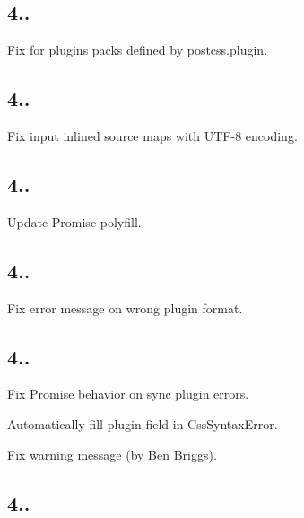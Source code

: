 \subsection*{4..}


\begin{DoxyItemize}
\item Fix for plugins packs defined by {\ttfamily postcss.\+plugin}.
\end{DoxyItemize}

\subsection*{4..}


\begin{DoxyItemize}
\item Fix input inlined source maps with U\+T\+F-\/8 encoding.
\end{DoxyItemize}

\subsection*{4..}


\begin{DoxyItemize}
\item Update Promise polyfill.
\end{DoxyItemize}

\subsection*{4..}


\begin{DoxyItemize}
\item Fix error message on wrong plugin format.
\end{DoxyItemize}

\subsection*{4..}


\begin{DoxyItemize}
\item Fix Promise behavior on sync plugin errors.
\item Automatically fill {\ttfamily plugin} field in {\ttfamily Css\+Syntax\+Error}.
\item Fix warning message (by Ben Briggs).
\end{DoxyItemize}

\subsection*{4..}


